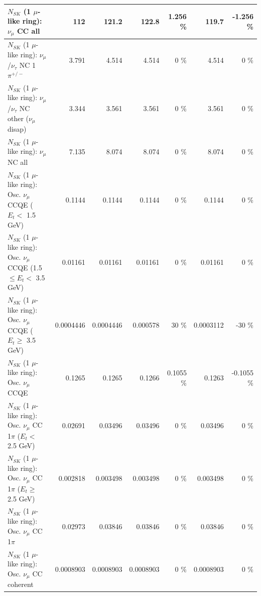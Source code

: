 \begin{table}
\begin{tabular}{| l | r | r | r  r | r  r |}
                                $N_{SK}$ (1 $\mu$-like ring): $\nu_{\mu}$ CC all &             112 &           121.2 &           122.8 &    1.256 \%  &           119.7 &   -1.256 \%  \\ 
\hline
              $N_{SK}$ (1 $\mu$-like ring): $\nu_\mu$/$\nu_\tau$ NC 1$\pi^{+/-}$ &           3.791 &           4.514 &           4.514 &        0 \%  &           4.514 &        0 \%  \\ 
   $N_{SK}$ (1 $\mu$-like ring): $\nu_\mu$/$\nu_\tau$ NC other ($\nu_\mu$ disap) &           3.344 &           3.561 &           3.561 &        0 \%  &           3.561 &        0 \%  \\ 
                                $N_{SK}$ (1 $\mu$-like ring): $\nu_{\mu}$ NC all &           7.135 &           8.074 &           8.074 &        0 \%  &           8.074 &        0 \%  \\ 
\hline
\hline
           $N_{SK}$ (1 $\mu$-like ring): Osc. $\nu_\mu$ CCQE ($E_{t} <$ 1.5 GeV) &          0.1144 &          0.1144 &          0.1144 &        0 \%  &          0.1144 &        0 \%  \\ 
  $N_{SK}$ (1 $\mu$-like ring): Osc. $\nu_\mu$ CCQE (1.5 $\leq E_{t} <$ 3.5 GeV) &         0.01161 &         0.01161 &         0.01161 &        0 \%  &         0.01161 &        0 \%  \\ 
        $N_{SK}$ (1 $\mu$-like ring): Osc. $\nu_\mu$ CCQE ($E_{t} \geq$ 3.5 GeV) &       0.0004446 &       0.0004446 &        0.000578 &       30 \%  &       0.0003112 &      -30 \%  \\ 
\hline
                               $N_{SK}$ (1 $\mu$-like ring): Osc. $\nu_\mu$ CCQE &          0.1265 &          0.1265 &          0.1266 &   0.1055 \%  &          0.1263 &  -0.1055 \%  \\ 
\hline
      $N_{SK}$ (1 $\mu$-like ring): Osc. $\nu_\mu$ CC 1$\pi$ ($E_{t} <$ 2.5 GeV) &         0.02691 &         0.03496 &         0.03496 &        0 \%  &         0.03496 &        0 \%  \\ 
   $N_{SK}$ (1 $\mu$-like ring): Osc. $\nu_\mu$ CC 1$\pi$ ($E_{t} \geq$ 2.5 GeV) &        0.002818 &        0.003498 &        0.003498 &        0 \%  &        0.003498 &        0 \%  \\ 
\hline
                          $N_{SK}$ (1 $\mu$-like ring): Osc. $\nu_\mu$ CC 1$\pi$ &         0.02973 &         0.03846 &         0.03846 &        0 \%  &         0.03846 &        0 \%  \\ 
                        $N_{SK}$ (1 $\mu$-like ring): Osc. $\nu_\mu$ CC coherent &       0.0008903 &       0.0008903 &       0.0008903 &        0 \%  &       0.0008903 &        0 \%  \\ 

\end{tabular}
\end{table}
